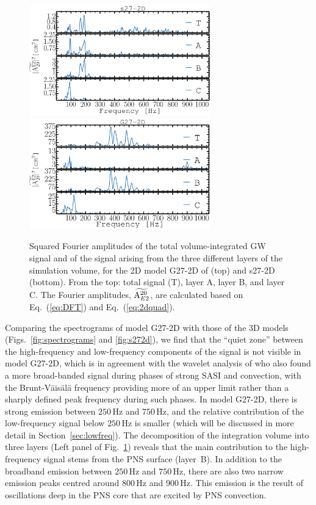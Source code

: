 \begin{figure}
\centering
\includegraphics[width=0.7\textwidth]{./images/paper1/fig9a.pdf} \\
\includegraphics[width=0.7\textwidth]{./images/paper1/fig9b.pdf}
\caption{Squared Fourier amplitudes of the total volume-integrated GW signal
  and of the signal arising from the three different layers of the simulation volume,
  for the 2D model G27-2D of \citet{mueller_13} (top) and s27-2D (bottom). 
  From the top: total signal (T), layer A, layer B, and layer C. 
  The Fourier amplitudes, $\widetilde{\mathrm{A}_{\mathrm\mathrm{E2}}^{\mathrm{20}}}$, are calculated based on Eq.~(\ref{eq:DFT}) and Eq.~(\ref{eq:2dquad}).
\label{fig:2dcut}}
\end{figure}
Comparing the spectrograms of model G27-2D with those of the 3D models
(Figs.~\ref{fig:spectrograms} and \ref{fig:s272d}), we find that the
``quiet zone'' between the high-frequency and low-frequency components
of the signal is not {visible} in model G27-2D, which is in
agreement with the wavelet analysis of \citet{mueller_13} who also
found a more broad-banded signal during phases of strong SASI and
convection, with the Brunt-V\"{a}is\"{a}l\"{a} frequency providing
more of an upper limit rather than a sharply defined peak frequency
during such phases. In model G27-2D, there is strong emission between
$250 \, \mathrm{Hz}$ and $750 \, \mathrm{Hz}$, and the relative
contribution of the low-frequency signal below $250 \, \mathrm{Hz}$ is
smaller (which will be discussed in more detail in
Section~\ref{sec:lowfreq}).  The decomposition of the integration
volume into three layers (Left panel of Fig.~\ref{fig:2dcut}) reveals
that the main contribution to the high-frequency signal stems from the
PNS surface (layer~B).  In addition to the broadband emission between
$250 \, \mathrm{Hz}$ and $750 \, \mathrm{Hz}$, there are also two
narrow emission peaks centred around $800 \, \mathrm{Hz}$ and $900 \,
\mathrm{Hz}$.  This emission is the result of oscillations deep in the
PNS core that are excited by PNS convection.

